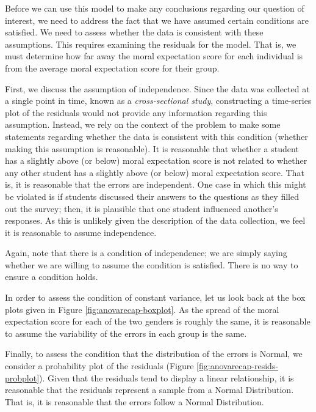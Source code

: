\documentclass[]{book}
\theoremstyle{definition}
\theoremstyle{definition}
\theoremstyle{definition}
\theoremstyle{remark}
\begin{document}
Before we can use this model to make any conclusions regarding our
question of interest, we need to address the fact that we have assumed
certain conditions are satisfied. We need to assess whether the data is
consistent with these assumptions. This requires examining the residuals
for the model. That is, we must determine how far away the moral
expectation score for each individual is from the average moral
expectation score for their group.

First, we discuss the assumption of independence. Since the data was
collected at a single point in time, known as a \emph{cross-sectional
study}, constructing a time-series plot of the residuals would not
provide any information regarding this assumption. Instead, we rely on
the context of the problem to make some statements regarding whether the
data is consistent with this condition (whether making this assumption
is reasonable). It is reasonable that whether a student has a slightly
above (or below) moral expectation score is not related to whether any
other student has a slightly above (or below) moral expectation score.
That is, it is reasonable that the errors are independent. One case in
which this might be violated is if students discussed their answers to
the questions as they filled out the survey; then, it is plausible that
one student influenced another's responses. As this is unlikely given
the description of the data collection, we feel it is reasonable to
assume independence.

Again, note that there is a condition of independence; we are simply
saying whether we are willing to assume the condition is satisfied.
There is no way to ensure a condition holds.

In order to assess the condition of constant variance, let us look back
at the box plots given in Figure \ref{fig:anovarecap-boxplot}. As the
spread of the moral expectation score for each of the two genders is
roughly the same, it is reasonable to assume the variability of the
errors in each group is the same.

Finally, to assess the condition that the distribution of the errors is
Normal, we consider a probability plot of the residuals (Figure
\ref{fig:anovarecap-resids-probplot}). Given that the residuals tend to
display a linear relationship, it is reasonable that the residuals
represent a sample from a Normal Distribution. That is, it is reasonable
that the errors follow a Normal Distribution.
\end{document}
